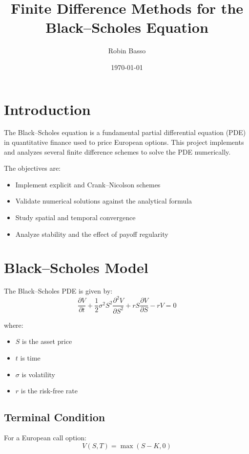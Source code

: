 \documentclass[11pt]{article}
\title{Finite Difference Methods for the Black--Scholes Equation}
\author{Robin Basso}
\date{\today}
\begin{document}
\maketitle

\section{Introduction}

The Black--Scholes equation is a fundamental partial differential equation (PDE) in quantitative finance used to price European options. This project implements and analyzes several finite difference schemes to solve the PDE numerically.

The objectives are:
\begin{itemize}
    \item Implement explicit and Crank--Nicolson schemes
    \item Validate numerical solutions against the analytical formula
    \item Study spatial and temporal convergence
    \item Analyze stability and the effect of payoff regularity
\end{itemize}

\section{Black--Scholes Model}

The Black--Scholes PDE is given by:
\begin{equation}
\frac{\partial V}{\partial t}
+ \frac{1}{2} \sigma^2 S^2 \frac{\partial^2 V}{\partial S^2}
+ r S \frac{\partial V}{\partial S}
- r V = 0
\end{equation}

where:
\begin{itemize}
    \item $S$ is the asset price
    \item $t$ is time
    \item $\sigma$ is volatility
    \item $r$ is the risk-free rate
\end{itemize}

\subsection{Terminal Condition}

For a European call option:
\begin{equation}
V(S, T) = \max(S - K, 0)
\end{equation}
\end{document}
